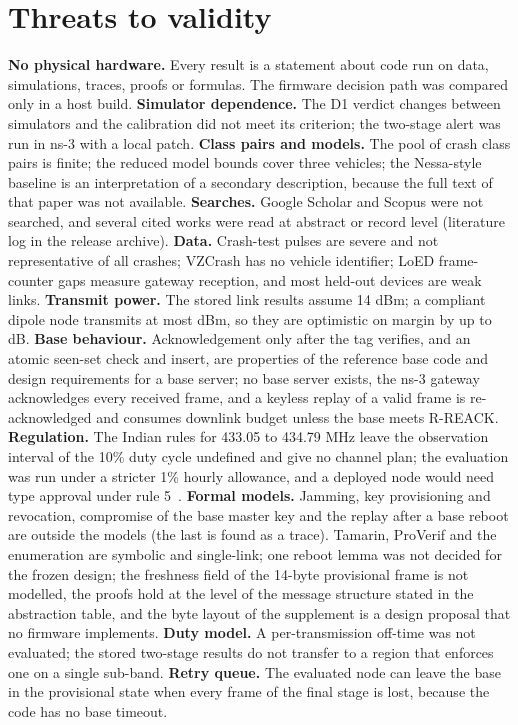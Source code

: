 \documentclass{ieeeaccess}
\begin{document}
\section{Threats to validity}
\label{sec:threats}
\textbf{No physical hardware.} Every result is a statement about code run on data, simulations, traces, proofs or formulas. The firmware decision path was compared only in a host build. \textbf{Simulator dependence.} The D1 verdict changes between simulators and the calibration did not meet its criterion; the two-stage alert was run in ns-3 with a local patch. \textbf{Class pairs and models.} The pool of crash class pairs is finite; the reduced model bounds cover three vehicles; the Nessa-style baseline is an interpretation of a secondary description, because the full text of that paper was not available. \textbf{Searches.} Google Scholar and Scopus were not searched, and several cited works were read at abstract or record level (literature log in the release archive). \textbf{Data.} Crash-test pulses are severe and not representative of all crashes; VZCrash has no vehicle identifier; LoED frame-counter gaps measure gateway reception, and most held-out devices are weak links. \textbf{Transmit power.} The stored link results assume 14 dBm; a compliant dipole node transmits at most \RsevbPowerMaxDipole{} dBm, so they are optimistic on margin by up to \RsevbPowerExtraDb{} dB. \textbf{Base behaviour.} Acknowledgement only after the tag verifies, and an atomic seen-set check and insert, are properties of the reference base code and design requirements for a base server; no base server exists, the ns-3 gateway acknowledges every received frame, and a keyless replay of a valid frame is re-acknowledged and consumes downlink budget unless the base meets R-REACK. \textbf{Regulation.} The Indian rules for 433.05 to 434.79 MHz leave the observation interval of the 10\% duty cycle undefined and give no channel plan; the evaluation was run under a stricter 1\% hourly allowance, and a deployed node would need type approval under rule 5~\cite{gsr347}. \textbf{Formal models.} Jamming, key provisioning and revocation, compromise of the base master key and the replay after a base reboot are outside the models (the last is found as a trace). Tamarin, ProVerif and the enumeration are symbolic and single-link; one reboot lemma was not decided for the frozen design; the freshness field of the 14-byte provisional frame is not modelled, the proofs hold at the level of the message structure stated in the abstraction table, and the byte layout of the supplement is a design proposal that no firmware implements. \textbf{Duty model.} A per-transmission off-time was not evaluated; the stored two-stage results do not transfer to a region that enforces one on a single sub-band. \textbf{Retry queue.} The evaluated node can leave the base in the provisional state when every frame of the final stage is lost, because the code has no base timeout.
\end{document}
